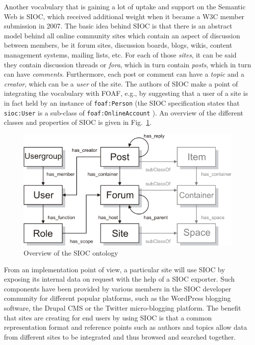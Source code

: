\documentclass{fast_latex}
\begin{document}
Another vocabulary that is gaining a lot of uptake and support on the Semantic Web is SIOC, which received additional weight when it became a W3C member submission in 2007. The basic idea behind SIOC is that there is an abstract model behind all online community sites which contain an aspect of discussion between members, be it forum sites, discussion boards, blogs, wikis, content management systems, mailing lists, etc. For each of those \emph{sites}, it can be said they contain discussion threads or \emph{fora}, which in turn contain \emph{posts}, which in turn can have \emph{comments}. Furthermore, each post or comment can have a \emph{topic} and a \emph{creator}, which can be a \emph{user} of the site. The authors of SIOC make a point of integrating the vocabulary with FOAF, e.g., by suggesting that a user of a site is in fact held by an instance of \texttt{foaf:Person} (the SIOC specification states that \texttt{sioc:User} is a sub-class of \texttt{foaf:OnlineAccount} \cite{sioc_spec2009}). An overview of the different classes and properties of SIOC is given in Fig.~\ref{fig:sioc_overview}.

\begin{figure}
  \begin{center}
    \includegraphics[width=\linewidth]{images/sioc_overview}
    \caption{Overview of the SIOC ontology}
    \label{fig:sioc_overview}
  \end{center}
\end{figure}

From an implementation point of view, a particular site will use SIOC by exposing its internal data on request with the help of a SIOC exporter. Such components have been provided by various members in the SIOC developer community for different popular platforms, such as the WordPress blogging software, the Drupal CMS or the Twitter micro-blogging platform. The benefit that sites are creating for end users by using SIOC is that a common representation format and reference points such as authors and topics allow data from different sites to be integrated and thus browsed and searched together.
\end{document}
